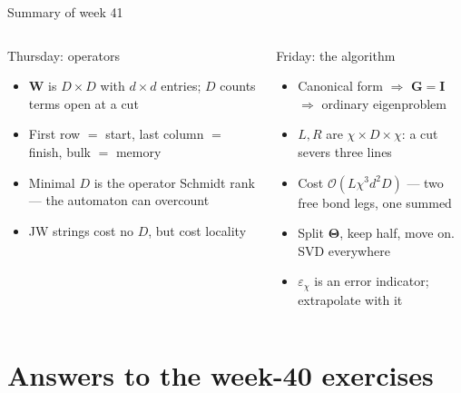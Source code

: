 \documentclass[aspectratio=169,10pt]{beamer}
\newcommand{\bigO}{\mathcal{O}}
\newcommand{\bmat}[1]{\bm{#1}}
\begin{document}
\begin{frame}{Summary of week 41}
  \small
  \begin{columns}[T]
    \begin{block}{Thursday: operators}
      \begin{itemize}
        \item $\bmat W$ is $D\times D$ with $d\times d$ entries; $D$ counts terms open at a cut
        \item First row $=$ start, last column $=$ finish, \alert{bulk $=$ memory}
        \item Minimal $D$ is the operator Schmidt rank --- the automaton can overcount
        \item JW strings cost no $D$, but cost locality
      \end{itemize}
    \end{block}
    \begin{block}{Friday: the algorithm}
      \begin{itemize}
        \item Canonical form $\Rightarrow$ $\bmat G=\bmat I$ $\Rightarrow$ ordinary eigenproblem
        \item $L,R$ are $\chi\times D\times\chi$: a cut severs three lines
        \item Cost $\bigO(L\chi^3d^2D)$ --- two free bond legs, one summed
        \item Split $\bm\Theta$, keep half, move on. SVD everywhere
        \item $\varepsilon_\chi$ is an error indicator; extrapolate with it
      \end{itemize}
    \end{block}
  \end{columns}
\end{frame}

\section{Answers to the week-40 exercises}
\end{document}
